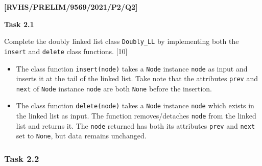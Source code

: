 \item \textbf{{[}RVHS/PRELIM/9569/2021/P2/Q2{]} }

\textbf{Task 2.1}

Complete the doubly linked list class \texttt{Doubly\_LL} by implementing
both the \texttt{insert} and \texttt{delete} class functions. \hfill{}{[}10{]}
\begin{itemize}
\item The class function \texttt{insert(node)} takes a \texttt{Node} instance
\texttt{node} as input and inserts it at the tail of the linked list.
Take note that the attributes \texttt{prev} and \texttt{next} of \texttt{Node}
instance \texttt{node} are both \texttt{None} before the insertion. 
\item The class function \texttt{delete(node)} takes a \texttt{Node} instance
\texttt{node} which exists in the linked list as input. The function
removes/detaches \texttt{node} from the linked list and returns it.
The \texttt{node} returned has both its attributes \texttt{prev} and
\texttt{next} set to \texttt{None}, but data remains unchanged. 
\end{itemize}

\subsubsection*{Task 2.2 }

